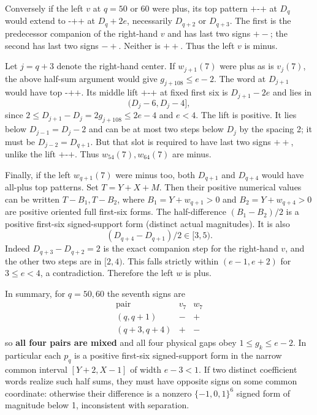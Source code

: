 \documentclass[
  11pt,
]{article}
\begin{document}
Conversely if the left \(v\) at \(q=50\) or 60 were plus, its top
pattern \(\texttt{+-+}\) at \(D_q\) would extend to \(\texttt{-++}\) at
\(D_q+2e\), necessarily \(D_{q+2}\) or \(D_{q+3}\). The first is the
predecessor companion of the right-hand \(v\) and has last two signs
\(+-\); the second has last two signs \(-+\). Neither is \(++\). Thus
the left \(v\) is minus.

Let \(j=q+3\) denote the right-hand center. If \(w_{j+1}(7)\) were plus
as is \(v_j(7)\), the above half-sum argument would give
\(g_{j+108}\le e-2\). The word at \(D_{j+1}\) would have top
\(\texttt{-++}\). Its middle lift \(\texttt{+-+}\) at fixed first six is
\(D_{j+1}-2e\) and lies in \[
 (D_j-6,D_j-4],
\] since \(2\le D_{j+1}-D_j=2g_{j+108}\le2e-4\) and \(e<4\). The lift is
positive. It lies below \(D_{j-1}=D_j-2\) and can be at most two steps
below \(D_j\) by the spacing 2; it must be \(D_{j-2}=D_{q+1}\). But that
slot is required to have last two signs \(++\), unlike the lift
\(\texttt{+-+}\). Thus \(w_{54}(7),w_{64}(7)\) are minus.

Finally, if the left \(w_{q+1}(7)\) were minus too, both \(D_{q+1}\) and
\(D_{q+4}\) would have all-plus top patterns. Set \(T=Y+X+M\). Then
their positive numerical values can be written \(T-B_1,T-B_2\), where
\(B_1=Y+w_{q+1}>0\) and \(B_2=Y+w_{q+4}>0\) are positive oriented full
first-six forms. The half-difference \((B_1-B_2)/2\) is a positive
first-six signed-support form (distinct actual magnitudes). It is also
\[
 (D_{q+4}-D_{q+1})/2\in[3,5).
\] Indeed \(D_{q+3}-D_{q+2}=2\) is the exact companion step for the
right-hand \(v\), and the other two steps are in \([2,4)\). This falls
strictly within \((e-1,e+2)\) for \(3\le e<4\), a contradiction.
Therefore the left \(w\) is plus.

In summary, for \(q=50,60\) the seventh signs are \[
\begin{array}{c|cc}
\text{pair}&v_7&w_7\\ \hline
(q,q+1)&-&+\\
(q+3,q+4)&+&-
\end{array}
\] so \textbf{all four pairs are mixed} and all four physical gaps obey
\(1\le g_k\le e-2\). In particular each \(p_q\) is a positive first-six
signed-support form in the narrow common interval \([Y+2,X-1]\) of width
\(e-3<1\). If two distinct coefficient words realize such half sums,
they must have opposite signs on some common coordinate: otherwise their
difference is a nonzero \(\{-1,0,1\}^6\) signed form of magnitude below
1, inconsistent with separation.
\end{document}
